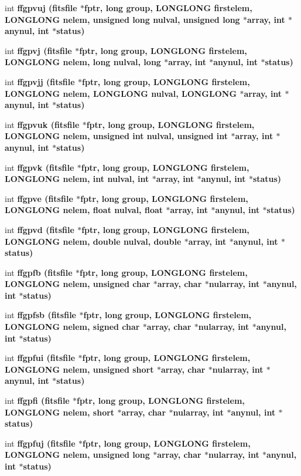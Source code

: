 \begin{CompactItemize}
\item 
int \bf{ffgpvuj} (\bf{fitsfile} $\ast$fptr, long group, \bf{LONGLONG} firstelem, \bf{LONGLONG} nelem, unsigned long nulval, unsigned long $\ast$array, int $\ast$anynul, int $\ast$status)
\item 
int \bf{ffgpvj} (\bf{fitsfile} $\ast$fptr, long group, \bf{LONGLONG} firstelem, \bf{LONGLONG} nelem, long nulval, long $\ast$array, int $\ast$anynul, int $\ast$status)
\item 
int \bf{ffgpvjj} (\bf{fitsfile} $\ast$fptr, long group, \bf{LONGLONG} firstelem, \bf{LONGLONG} nelem, \bf{LONGLONG} nulval, \bf{LONGLONG} $\ast$array, int $\ast$anynul, int $\ast$status)
\item 
int \bf{ffgpvuk} (\bf{fitsfile} $\ast$fptr, long group, \bf{LONGLONG} firstelem, \bf{LONGLONG} nelem, unsigned int nulval, unsigned int $\ast$array, int $\ast$anynul, int $\ast$status)
\item 
int \bf{ffgpvk} (\bf{fitsfile} $\ast$fptr, long group, \bf{LONGLONG} firstelem, \bf{LONGLONG} nelem, int nulval, int $\ast$array, int $\ast$anynul, int $\ast$status)
\item 
int \bf{ffgpve} (\bf{fitsfile} $\ast$fptr, long group, \bf{LONGLONG} firstelem, \bf{LONGLONG} nelem, float nulval, float $\ast$array, int $\ast$anynul, int $\ast$status)
\item 
int \bf{ffgpvd} (\bf{fitsfile} $\ast$fptr, long group, \bf{LONGLONG} firstelem, \bf{LONGLONG} nelem, double nulval, double $\ast$array, int $\ast$anynul, int $\ast$status)
\item 
int \bf{ffgpfb} (\bf{fitsfile} $\ast$fptr, long group, \bf{LONGLONG} firstelem, \bf{LONGLONG} nelem, unsigned char $\ast$array, char $\ast$nularray, int $\ast$anynul, int $\ast$status)
\item 
int \bf{ffgpfsb} (\bf{fitsfile} $\ast$fptr, long group, \bf{LONGLONG} firstelem, \bf{LONGLONG} nelem, signed char $\ast$array, char $\ast$nularray, int $\ast$anynul, int $\ast$status)
\item 
int \bf{ffgpfui} (\bf{fitsfile} $\ast$fptr, long group, \bf{LONGLONG} firstelem, \bf{LONGLONG} nelem, unsigned short $\ast$array, char $\ast$nularray, int $\ast$anynul, int $\ast$status)
\item 
int \bf{ffgpfi} (\bf{fitsfile} $\ast$fptr, long group, \bf{LONGLONG} firstelem, \bf{LONGLONG} nelem, short $\ast$array, char $\ast$nularray, int $\ast$anynul, int $\ast$status)
\item 
int \bf{ffgpfuj} (\bf{fitsfile} $\ast$fptr, long group, \bf{LONGLONG} firstelem, \bf{LONGLONG} nelem, unsigned long $\ast$array, char $\ast$nularray, int $\ast$anynul, int $\ast$status)

\end{CompactItemize}
